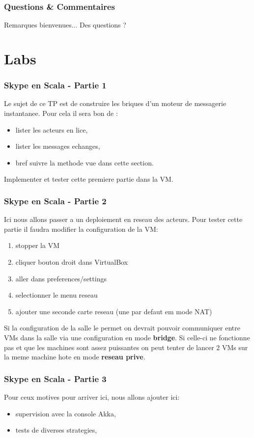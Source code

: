 \documentclass[xcolor=dvipsnames]{beamer}
\begin{document}
\begin{frame}
  \frametitle{Questions \& Commentaires}
  Remarques bienvenues...
  Des questions ?
\end{frame}

\section{Labs}
\begin{frame}
  \frametitle{Skype en Scala - Partie 1}
  Le sujet de ce TP est de construire les briques d'un moteur de messagerie instantanee.
  Pour cela il sera bon de :
  \begin{itemize}
  \item lister les acteurs en lice,
  \item lister les messages echanges,
  \item bref suivre la methode vue dans cette section.
  \end{itemize}
  Implementer et tester cette premiere partie dans la VM.
\end{frame}

\begin{frame}
  \frametitle{Skype en Scala - Partie 2}
  Ici nous allons passer a un deploiement en reseau des acteurs.
  Pour tester cette partie il faudra modifier la configuration de
  la VM:
  \begin{enumerate}
  \item stopper la VM
  \item cliquer bouton droit dans VirtualBox
  \item aller dans preferences/settings
  \item selectionner le menu reseau
  \item ajouter une seconde carte reseau (une par defaut em mode NAT)
  \end{enumerate}
  Si la configuration de la salle le permet on devrait pouvoir communiquer entre VMs dans la salle via une configuration en mode \textbf{bridge}. Si celle-ci ne fonctionne pas et que les machines sont assez puissantes on peut tenter de  lancer 2 VMs sur la meme machine hote en mode \textbf{reseau prive}.
\end{frame}

\begin{frame}
  \frametitle{Skype en Scala - Partie 3}
  Pour ceux motives pour arriver ici, nous allons ajouter ici:
  \begin{itemize}
  \item supervision avec la console Akka,
  \item tests de diverses strategies,
  \end{itemize}
\end{frame}
\end{document}

